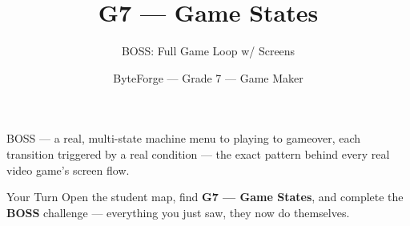 \documentclass[aspectratio=169]{beamer}
\title{G7 — Game States}
\subtitle{BOSS: Full Game Loop w/ Screens}
\author{ByteForge --- Grade 7 --- Game Maker}
\date{}
\begin{document}
\begin{frame}
    \titlepage
\end{frame}

\begin{frame}{BOSS — a real, multi-state machine}
    \Large
    menu to playing to gameover, each transition triggered by a real condition — the exact pattern behind every real video game's screen flow.
\end{frame}

\begin{frame}{Your Turn}
    \Large
    Open the student map, find \textbf{G7 — Game States}, and complete
    the \textbf{BOSS} challenge --- everything you just saw, they now do themselves.
\end{frame}
\end{document}
